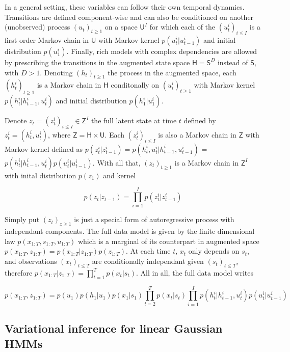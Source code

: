 \documentclass{article}
\newcommand{\1}{\mathbbm{1}}
\begin{document}
In a general setting, these variables can follow their own temporal dynamics. Transitions are defined component-wise and can also be conditioned on another (unobserved) process $(u_t)_{t \geq 1}$ on a space $\mathsf{U}^I$ for which each of the $(u_t^i)_{i \leq I}$ is a first order Markov chain in $\mathsf{U}$ with Markov kernel $p(u_t^i|u_{t-1}^i)$ and initial distribution $p(u_1^i)$. Finally, rich models with complex dependencies are allowed by prescribing the transitions in the augmented state space $\mathsf{H} = \mathsf{S}^D$ instead of $\mathsf{S}$, with $D > 1$. Denoting $(h_t)_{t \geq 1}$ the process in the augmented space, each $(h_t^i)_{t \geq 1}$ is a Markov chain in $\mathsf{H}$ conditonally on $(u_t^i)_{t \geq 1}$ with Markov kernel $p(h_t^i|h_{t-1}^i,u_t^i)$ and initial distribution $p(h_1^i|u_1^i)$.

Denote $z_t = (z_t^i)_{i \leq I} \in \mathsf{Z}^I$ the full latent state at time $t$ defined by $z_t^i = (h_t^i, u_t^i)$, where $\mathsf{Z} = \mathsf{H} \times \mathsf{U}$. Each $(z_t^i)_{i \leq I}$ is also a Markov chain in $\mathsf{Z}$ with Markov kernel defined as $p(z_t^i|z_{t-1}^i) = p(h_t^i,u_t^i|h_{t-1}^i, u_{t-1}^i)$ = $p(h_t^i|h_{t-1}^i,u_t^i)p(u_t^i|u_{t-1}^i)$. With all that, $(z_t)_{t \geq 1}$ is a Markov chain in $\mathsf{Z}^I$ with inital distribution $p(z_1)$ and kernel

\begin{equation}\label{kernel_z}
    p(z_t|z_{t-1}) = \prod_{i=1}^I p(z_t^i|z_{t-1}^i)
\end{equation}


Simply put $(z_t)_{z \geq 1}$ is just a special form of autoregressive process with independant components. The full data model is given by the finite dimensional law $p(x_{1:T}, s_{1:T}, u_{1:T})$ which is a marginal of its counterpart in augmented space $p(x_{1:T}, z_{1:T}) = p(x_{1:T} \vert z_{1:T})p(z_{1:T})$. At each time $t$, $x_t$ only depends on $s_t$, and observations $(x_t)_{t \leq T}$ are conditionally independant given $(s_t)_{t \leq T}$, therefore $p(x_{1:T} \vert z_{1:T}) = \prod_{t=1}^T p(x_t|s_t)$. All in all, the full data model writes


\begin{equation}\label{full_model}
    p(x_{1:T}, z_{1:T}) = p(u_1)p(h_1|u_1) p(x_1|s_1) \prod_{t=2}^T p(x_t|s_t) \prod_{i=1}^I p(h_t^i|h_{t-1}^i,u_t^i)p(u_t^i|u_{t-1}^i)
\end{equation} 

\subsection{Variational inference for linear Gaussian HMMs}\label{linear_gauss}
\end{document}
